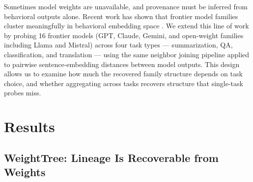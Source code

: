 \documentclass{article}
\begin{document}
Sometimes model weights are unavailable, and provenance must be inferred from behavioral outputs alone. Recent work has shown that frontier model families cluster meaningfully in behavioral embedding space
\citep{wu2026llmdna, yax2025phylolm}. We extend this line of work by probing 16 frontier models (GPT, Claude, Gemini, and open-weight families including Llama and Mistral) across four task types --- summarization, QA, classification, and translation --- using the same neighbor joining pipeline applied to pairwise sentence-embedding distances between model outputs. This design allows us to examine how much the recovered family structure depends
on task choice, and whether aggregating across tasks recovers structure that
single-task probes miss.


\section{Results}
\label{sec:results}

\subsection{WeightTree: Lineage Is Recoverable from Weights}
\label{sec:results:weighttree}
\end{document}

